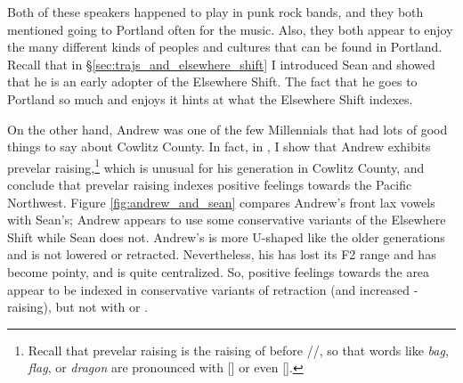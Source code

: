 Both of these speakers happened to play in punk rock bands, and they both mentioned going to Portland often for the music. Also, they both appear to enjoy the many different kinds of peoples and cultures that can be found in Portland. Recall that in \S\ref{sec:trajs_and_elsewhere_shift} I introduced Sean and showed that he is an early adopter of the Elsewhere Shift. The fact that he goes to Portland so much and enjoys it hints at what the Elsewhere Shift indexes.

On the other hand, Andrew was one of the few Millennials that had lots of good things to say about Cowlitz County. In fact, in \citet{stanley_2018_pwpl}, I show that Andrew exhibits prevelar raising,\footnote{Recall that prevelar raising is the raising of \trap before //, so that words like \textit{bag}, \textit{flag}, or \textit{dragon} are pronounced with [] or even [].} which is unusual for his generation in Cowlitz County, and conclude that prevelar raising indexes positive feelings towards the Pacific Northwest. Figure \ref{fig:andrew_and_sean} compares Andrew's front lax vowels with Sean's; Andrew appears to use some conservative variants of the Elsewhere Shift while Sean does not. Andrew's \bat is more U-shaped like the older generations and is not lowered or retracted. Nevertheless, his \bet has lost its F2 range and has become pointy, and \bit is quite centralized. So, positive feelings towards the area appear to be indexed in conservative variants of \bat retraction (and increased \bag-raising), but not with \bet or \bit.

